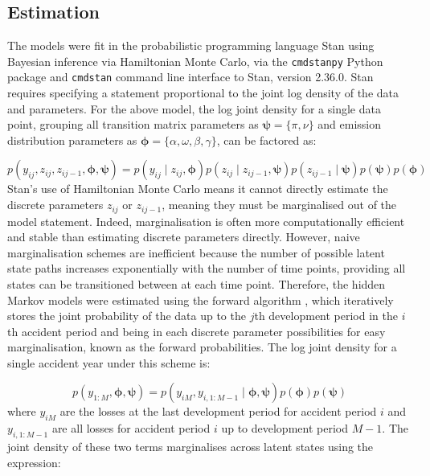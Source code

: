 \subsection{Estimation}
The models were fit in the probabilistic programming language
Stan \citep{stan2017} using Bayesian inference
via Hamiltonian Monte Carlo, via the \texttt{cmdstanpy} \citep{cmdstanpy2024} 
Python package and \texttt{cmdstan} \citep{cmdstan2024}
command line interface to Stan, version 2.36.0.
Stan requires specifying a statement
proportional to the joint log density of the data and parameters.
For the above model, the log joint density for a single data point,
grouping all transition matrix parameters as $\bm{\psi} = \{\pi, \nu\}$
and emission distribution parameters as $\bm{\phi} = \{\alpha,
\omega, \beta, \gamma\}$, can be factored as:

\begin{equation}
p(y_{ij}, z_{ij}, z_{ij-1}, \bm{\phi}, \bm{\psi}) = 
    p(y_{ij} \mid  z_{ij}, \bm{\phi})
    p(z_{ij} \mid z_{ij-1}, \bm{\psi})
    p(z_{ij-1} \mid \bm{\psi})
    p(\bm{\psi})
    p(\bm{\phi})
\end{equation}
%
Stan's use of Hamiltonian Monte Carlo means it cannot
directly estimate the discrete parameters 
$z_{ij}$ or $z_{ij-1}$, meaning they
must be marginalised out of the model statement.
Indeed, marginalisation is often more computationally
efficient and stable than estimating discrete parameters
directly.
However, naive marginalisation schemes are inefficient
because the number of possible latent state paths increases
exponentially with the number of time points,
providing all states can be transitioned between
at each time point. Therefore, the hidden Markov
models were estimated using the forward algorithm
\citep{rabiner1989},
which iteratively stores the joint probability
of the data up to the $j$th development period
in the $i$th accident period and 
being in each discrete parameter possibilities
for easy marginalisation, known as the forward
probabilities. 
The log joint density for a single accident year under
this scheme is:

\begin{equation}
    p(y_{1:M}, \bm{\phi}, \bm{\psi}) = p(y_{iM}, y_{i,1:M-1} \mid \bm{\phi}, \bm{\psi})
    p(\bm{\phi}) p(\bm{\psi})
\end{equation}
%
where $y_{iM}$ are the losses at the
last development period for accident period $i$
and $y_{i,1:M-1}$ are all losses for accident period $i$ up to 
development period $M - 1$. The joint
density of these two terms marginalises
across latent states using the expression:

